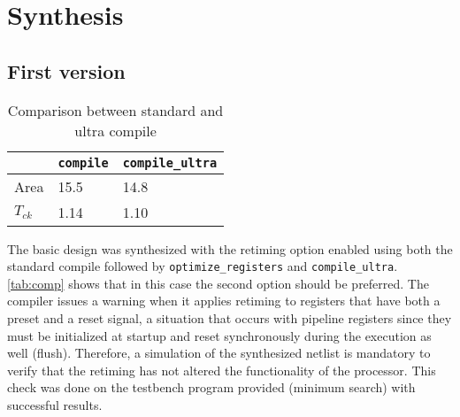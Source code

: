 \chapter{Synthesis}
\section{First version}
\begin{table}[h]
\begin{tabular}{|l|l|l|}
	\hline
	& \texttt{compile} & \texttt{compile\_ultra}\\\hline
	Area & 15.5 & 14.8 \\\hline
	$T_{ck}$& 1.14 & 1.10\\\hline
\end{tabular}
\caption{Comparison between standard and ultra compile}
\label{tab:comp}
\end{table}

The basic design was synthesized with the retiming option enabled using both the standard compile followed by \texttt{optimize\_registers} and \texttt{compile\_ultra}. \autoref{tab:comp} shows that in this case the second option should be preferred. The compiler issues a warning when it applies retiming to registers that have both a preset and a reset signal, a situation that occurs with pipeline registers since they must be initialized at startup and reset synchronously during the execution as well (flush). Therefore, a simulation of the synthesized netlist is mandatory to verify that the retiming has not altered the functionality of the processor. This check was done on the testbench program provided (minimum search) with successful results.